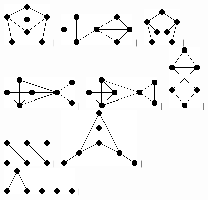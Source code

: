\documentclass[11pt,paper=b5,footinclude,headinclude]{scrbook} %
\newtheorem{ex}{Vaja\hypertarget{sol:\theex}}[chapter]
\begin{document}
\begin{ex}
\begin{figure}
\includegraphics[scale=0.5]{smallGraphs/g_co-X89.png}$\,\mid\,$\
\includegraphics[scale=0.5]{smallGraphs/g_co-X9.png}$\,\mid\,$\
\includegraphics[scale=0.5]{smallGraphs/g_co-X90.png}$\,\mid\,$\
\includegraphics[scale=0.5]{smallGraphs/g_co-X92.png}$\,\mid\,$\
\includegraphics[scale=0.5]{smallGraphs/g_co-X93.png}$\,\mid\,$\
\includegraphics[scale=0.5]{smallGraphs/g_co-X95.png}$\,\mid\,$\
\includegraphics[scale=0.5]{smallGraphs/g_co-X96.png}$\,\mid\,$\
\includegraphics[scale=0.5]{smallGraphs/g_co-X97.png}$\,\mid\,$\
\includegraphics[scale=0.5]{smallGraphs/g_co-X98.png}$\,\mid\,$\

\end{figure}
\end{ex}
\end{document}
